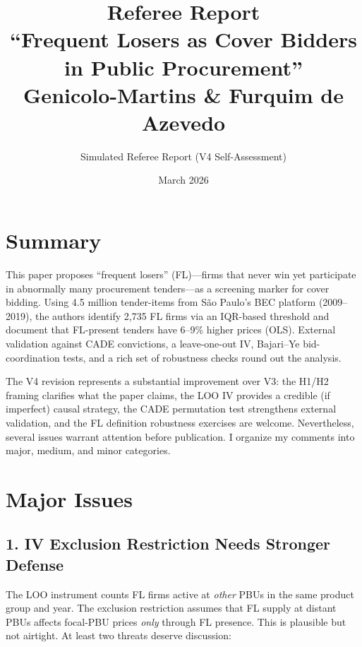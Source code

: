 \documentclass[12pt]{article}
\title{Referee Report\\[6pt]
\large ``Frequent Losers as Cover Bidders in Public Procurement''\\
\large Genicolo-Martins \& Furquim de Azevedo}
\author{Simulated Referee Report (V4 Self-Assessment)}
\date{March 2026}
\begin{document}
\maketitle

\section*{Summary}

This paper proposes ``frequent losers'' (FL)---firms that never win yet
participate in abnormally many procurement tenders---as a screening
marker for cover bidding. Using 4.5 million tender-items from S\~ao
Paulo's BEC platform (2009--2019), the authors identify 2,735 FL firms
via an IQR-based threshold and document that FL-present tenders have
6--9\% higher prices (OLS). External validation against CADE convictions,
a leave-one-out IV, Bajari--Ye bid-coordination tests, and a rich set of
robustness checks round out the analysis.

The V4 revision represents a substantial improvement over V3: the H1/H2
framing clarifies what the paper claims, the LOO IV provides a credible
(if imperfect) causal strategy, the CADE permutation test strengthens
external validation, and the FL definition robustness exercises are
welcome. Nevertheless, several issues warrant attention before
publication. I organize my comments into major, medium, and minor
categories.

\section*{Major Issues}

\subsection*{1. IV Exclusion Restriction Needs Stronger Defense}

The LOO instrument counts FL firms active at \emph{other} PBUs in the
same product group and year. The exclusion restriction assumes that FL
supply at distant PBUs affects focal-PBU prices \emph{only} through FL
presence. This is plausible but not airtight. At least two threats
deserve discussion:
\end{document}
